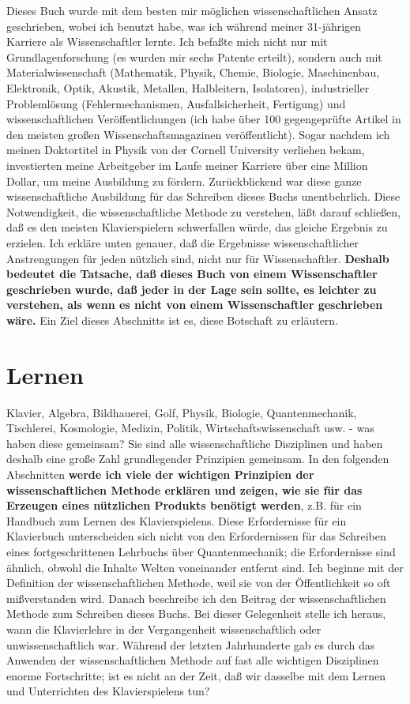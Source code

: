 Dieses Buch wurde mit dem besten mir möglichen wissenschaftlichen Ansatz geschrieben, wobei ich benutzt habe, was ich während meiner 31-jährigen Karriere als Wissenschaftler lernte.
Ich befaßte mich nicht nur mit Grundlagenforschung (es wurden mir sechs Patente erteilt), sondern auch mit Materialwissenschaft (Mathematik, Physik, Chemie, Biologie, Maschinenbau, Elektronik, Optik, Akustik, Metallen, Halbleitern, Isolatoren), industrieller Problemlösung (Fehlermechanismen, Ausfallsicherheit, Fertigung) und wissenschaftlichen Veröffentlichungen (ich habe über 100 gegengeprüfte Artikel in den meisten großen Wissenschaftsmagazinen veröffentlicht).
Sogar nachdem ich meinen Doktortitel in Physik von der Cornell University verliehen bekam, investierten meine Arbeitgeber im Laufe meiner Karriere über eine Million Dollar, um meine Ausbildung zu fördern.
Zurückblickend war diese ganze wissenschaftliche Ausbildung für das Schreiben dieses Buchs unentbehrlich.
Diese Notwendigkeit, die wissenschaftliche Methode zu verstehen, läßt darauf schließen, daß es den meisten Klavierspielern schwerfallen würde, das gleiche Ergebnis zu erzielen.
Ich erkläre unten genauer, daß die Ergebnisse wissenschaftlicher Anstrengungen für jeden nützlich sind, nicht nur für Wissenschaftler.
\textbf{Deshalb bedeutet die Tatsache, daß dieses Buch von einem Wissenschaftler geschrieben wurde, daß jeder in der Lage sein sollte, es leichter zu verstehen, als wenn es nicht von einem Wissenschaftler geschrieben wäre.}
Ein Ziel dieses Abschnitts ist es, diese Botschaft zu erläutern.


\section{Lernen}
\label{c3_2b}

Klavier, Algebra, Bildhauerei, Golf, Physik, Biologie, Quantenmechanik, Tischlerei, Kosmologie, Medizin, Politik, Wirtschaftswissenschaft usw. - was haben diese gemeinsam?
Sie sind alle wissenschaftliche Disziplinen und haben deshalb eine große Zahl grundlegender Prinzipien gemeinsam.
In den folgenden Abschnitten \textbf{werde ich viele der wichtigen Prinzipien der wissenschaftlichen Methode erklären und zeigen, wie sie für das Erzeugen eines nützlichen Produkts benötigt werden}, z.B. für ein Handbuch zum Lernen des Klavierspielens.
Diese Erfordernisse für ein Klavierbuch unterscheiden sich nicht von den Erfordernissen für das Schreiben eines fortgeschrittenen Lehrbuchs über Quantenmechanik; die Erfordernisse sind ähnlich, obwohl die Inhalte Welten voneinander entfernt sind.
Ich beginne mit der Definition der wissenschaftlichen Methode, weil sie von der Öffentlichkeit so oft mißverstanden wird.
Danach beschreibe ich den Beitrag der wissenschaftlichen Methode zum Schreiben dieses Buchs.
Bei dieser Gelegenheit stelle ich heraus, wann die Klavierlehre in der Vergangenheit wissenschaftlich oder unwissenschaftlich war.
Während der letzten Jahrhunderte gab es durch das Anwenden der wissenschaftlichen Methode auf fast alle wichtigen Disziplinen enorme Fortschritte; ist es nicht an der Zeit, daß wir dasselbe mit dem Lernen und Unterrichten des Klavierspielens tun?

